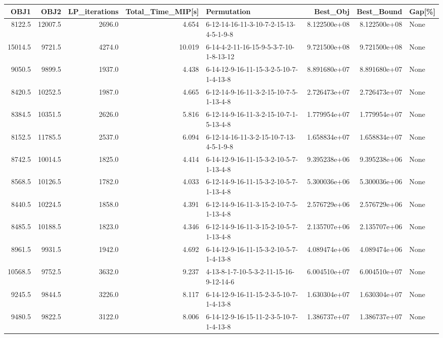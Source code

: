 \begin{tabular}{rrrrlrrl}
\toprule
    OBJ1 &     OBJ2 &  LP\_iterations &  Total\_Time\_MIP[s] &                             Permutation &      Best\_Obj &    Best\_Bound & Gap[\%] \\
\midrule
  8122.5 &  12007.5 &         2696.0 &              4.654 &  6-12-14-16-11-3-10-7-2-15-13-4-5-1-9-8 &  8.122500e+08 &  8.122500e+08 &   None \\
 15014.5 &   9721.5 &         4274.0 &             10.019 &  6-14-4-2-11-16-15-9-5-3-7-10-1-8-13-12 &  9.721500e+08 &  9.721500e+08 &   None \\
  9050.5 &   9899.5 &         1937.0 &              4.438 &  6-14-12-9-16-11-15-3-2-5-10-7-1-4-13-8 &  8.891680e+07 &  8.891680e+07 &   None \\
  8420.5 &  10252.5 &         1987.0 &              4.665 &  6-12-14-9-16-11-3-2-15-10-7-5-1-13-4-8 &  2.726473e+07 &  2.726473e+07 &   None \\
  8384.5 &  10351.5 &         2626.0 &              5.816 &  6-12-14-9-16-11-3-2-15-10-7-1-5-13-4-8 &  1.779954e+07 &  1.779954e+07 &   None \\
  8152.5 &  11785.5 &         2537.0 &              6.094 &  6-12-14-16-11-3-2-15-10-7-13-4-5-1-9-8 &  1.658834e+07 &  1.658834e+07 &   None \\
  8742.5 &  10014.5 &         1825.0 &              4.414 &  6-14-12-9-16-11-15-3-2-10-5-7-1-13-4-8 &  9.395238e+06 &  9.395238e+06 &   None \\
  8568.5 &  10126.5 &         1782.0 &              4.033 &  6-12-14-9-16-11-15-3-2-10-5-7-1-13-4-8 &  5.300036e+06 &  5.300036e+06 &   None \\
  8440.5 &  10224.5 &         1858.0 &              4.391 &  6-12-14-9-16-11-3-15-2-10-7-5-1-13-4-8 &  2.576729e+06 &  2.576729e+06 &   None \\
  8485.5 &  10188.5 &         1823.0 &              4.346 &  6-12-14-9-16-11-3-15-2-10-5-7-1-13-4-8 &  2.135707e+06 &  2.135707e+06 &   None \\
  8961.5 &   9931.5 &         1942.0 &              4.692 &  6-14-12-9-16-11-15-3-2-10-5-7-1-4-13-8 &  4.089474e+06 &  4.089474e+06 &   None \\
 10568.5 &   9752.5 &         3632.0 &              9.237 &  4-13-8-1-7-10-5-3-2-11-15-16-9-12-14-6 &  6.004510e+07 &  6.004510e+07 &   None \\
  9245.5 &   9844.5 &         3226.0 &              8.117 &  6-14-12-9-16-11-15-2-3-5-10-7-1-4-13-8 &  1.630304e+07 &  1.630304e+07 &   None \\
  9480.5 &   9822.5 &         3122.0 &              8.006 &  6-14-12-9-16-15-11-2-3-5-10-7-1-4-13-8 &  1.386737e+07 &  1.386737e+07 &   None \\
\bottomrule
\end{tabular}
